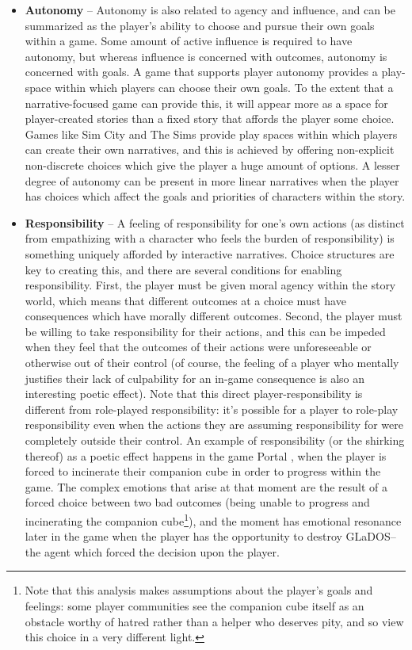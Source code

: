 \begin{itemize}
  \item \textbf{Autonomy} -- Autonomy is also related to agency and influence, and can be summarized as the player's ability to choose and pursue their own goals within a game.
%
Some amount of active influence is required to have autonomy, but whereas influence is concerned with outcomes, autonomy is concerned with goals.
%
A game that supports player autonomy provides a play-space within which players can choose their own goals.
%
To the extent that a narrative-focused game can provide this, it will appear more as a space for player-created stories than a fixed story that affords the player some choice.
%
Games like Sim City \citep{SimCity} and The Sims \citep{TheSims} provide play spaces within which players can create their own narratives, and this is achieved by offering non-explicit non-discrete choices which give the player a huge amount of options.
%
A lesser degree of autonomy can be present in more linear narratives when the player has choices which affect the goals and priorities of characters within the story.

  \item \textbf{Responsibility} -- A feeling of responsibility for one's own actions (as distinct from empathizing with a character who feels the burden of responsibility) is something uniquely afforded by interactive narratives.
%
Choice structures are key to creating this, and there are several conditions for enabling responsibility.
%
First, the player must be given moral agency within the story world, which means that different outcomes at a choice must have consequences which have morally different outcomes.
%
Second, the player must be willing to take responsibility for their actions, and this can be impeded when they feel that the outcomes of their actions were unforeseeable or otherwise out of their control (of course, the feeling of a player who mentally justifies their lack of culpability for an in-game consequence is also an interesting poetic effect).
%
Note that this direct player-responsibility is different from role-played responsibility: it's possible for a player to role-play responsibility even when the actions they are assuming responsibility for were completely outside their control.
%
An example of responsibility (or the shirking thereof) as a poetic effect happens in the game Portal \citep{Portal}, when the player is forced to incinerate their companion cube in order to progress within the game.
%
The complex emotions that arise at that moment are the result of a forced choice between two bad outcomes (being unable to progress and incinerating the companion cube\footnote{Note that this analysis makes assumptions about the player's goals and feelings: some player communities see the companion cube itself as an obstacle worthy of hatred rather than a helper who deserves pity, and so view this choice in a very different light.}), and the moment has emotional resonance later in the game when the player has the opportunity to destroy GLaDOS--the agent which forced the decision upon the player.



\end{itemize}
